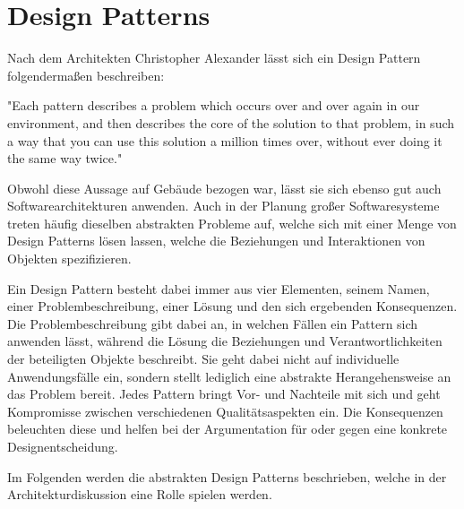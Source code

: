 \section{Design Patterns}
Nach dem Architekten Christopher Alexander lässt sich ein Design Pattern folgendermaßen beschreiben:

"Each pattern describes a problem which occurs over and over again in our environment, and then describes the core of the solution to that problem, in such a way that you can use this solution a million times over, without ever doing it the same way twice."

Obwohl diese Aussage auf Gebäude bezogen war, lässt sie sich ebenso gut auch Softwarearchitekturen anwenden. Auch in der Planung großer Softwaresysteme treten häufig dieselben abstrakten Probleme auf, welche sich mit einer Menge von Design Patterns lösen lassen, welche die Beziehungen und Interaktionen von Objekten spezifizieren.

Ein Design Pattern besteht dabei immer aus vier Elementen, seinem Namen, einer Problembeschreibung, einer Lösung und den sich ergebenden Konsequenzen. Die Problembeschreibung gibt dabei an, in welchen Fällen ein Pattern sich anwenden lässt, während die Lösung die Beziehungen und Verantwortlichkeiten der beteiligten Objekte beschreibt. Sie geht dabei nicht auf individuelle Anwendungsfälle ein, sondern stellt lediglich eine abstrakte Herangehensweise an das Problem bereit. Jedes Pattern bringt Vor- und Nachteile mit sich und geht Kompromisse zwischen verschiedenen Qualitätsaspekten ein. Die Konsequenzen beleuchten diese  und helfen bei der Argumentation für oder gegen eine konkrete Designentscheidung.

Im Folgenden werden die abstrakten Design Patterns beschrieben, welche in der Architekturdiskussion eine Rolle spielen werden.







